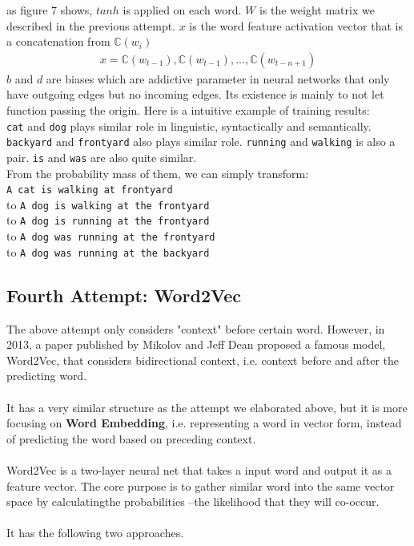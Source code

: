\documentclass[paper=a4, fontsize=12pt]{scrartcl}
\begin{document}
as figure 7 shows, $tanh$ is applied on each word. $W$ is the weight matrix we described in the previous attempt. $x$ is the word feature activation vector that is a concatenation from $\mathbb{C}(w_i)$
\begin{align*}
x = \mathbb{C}(w_{t-1}), \mathbb{C}(w_{t-1}), ..., \mathbb{C}(w_{t-n+1})
\end{align*}
$b$ and $d$ are biases which are addictive parameter in neural networks that only have outgoing edges but no incoming edges. Its existence is mainly to not let function passing the origin. 
Here is a intuitive example of training results: \\
\texttt{cat} and \texttt{dog} plays similar role in linguistic, syntactically and semantically. \texttt{backyard} and \texttt{frontyard} also plays similar role. \texttt{running} and \texttt{walking} is also a pair. \texttt{is} and \texttt{was} are also quite similar. \\
From the probability mass of them, we can simply transform:\\
\texttt{A cat is walking at frontyard} \\
to \texttt{A dog is walking at the frontyard} \\
to \texttt{A dog is running at the frontyard} \\
to \texttt{A dog was running at the frontyard} \\
to \texttt{A dog was running at the backyard}
\subsection{Fourth Attempt: Word2Vec}
The above attempt only considers "context" before certain word. However, in 2013, a paper published by Mikolov and Jeff Dean proposed a famous model, Word2Vec, that considers bidirectional context, i.e. context before and after the predicting word. \\\\
It has a very similar structure as the attempt we elaborated above, but it is more focusing on \textbf{Word Embedding}, i.e. representing a word in vector form,  instead of predicting the word based on preceding context.\\\\
Word2Vec is a two-layer neural net that takes a input word and output it as a feature vector. The core purpose is to gather similar word into the same vector space by calculatingthe probabilities --the likelihood that they will co-occur.\\\\
It has the following two approaches. 
\end{document}
